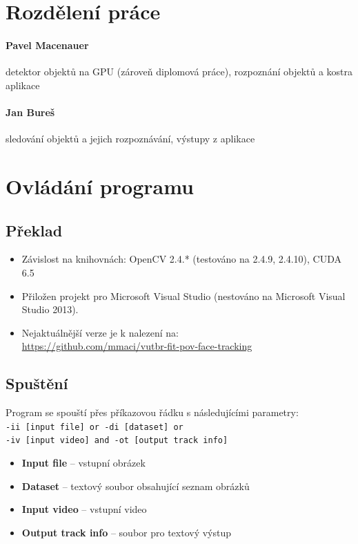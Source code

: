\documentclass[12pt,a4paper,titlepage,final]{report}
\begin{document}
\section{Rozdělení práce}
\paragraph{Pavel Macenauer} detektor objektů na GPU (zároveň diplomová práce), rozpoznání objektů a kostra aplikace

\paragraph{Jan Bureš} sledování objektů a jejich rozpoznávání, výstupy z aplikace

\section{Ovládání programu}

\subsection{Překlad}

\begin{itemize}
\item Závislost na knihovnách: OpenCV 2.4.* (testováno na 2.4.9, 2.4.10), CUDA 6.5 \\
\item Přiložen projekt pro Microsoft Visual Studio (nestováno na Microsoft Visual Studio 2013).
\item Nejaktuálnější verze je k nalezení na:\\  \url{https://github.com/mmaci/vutbr-fit-pov-face-tracking}
\end{itemize}

\subsection{Spuštění}

Program se spouští přes příkazovou řádku s následujícími parametry: \\
\verb|-ii [input file] or -di [dataset] or| \\ \verb|-iv [input video] and -ot [output track info]|

\begin{itemize}
\item \textbf{Input file} – vstupní obrázek
\item \textbf{Dataset} – textový soubor obsahující seznam obrázků
\item \textbf{Input video} – vstupní video
\item \textbf{Output track info} – soubor pro textový výstup
\end{itemize}
\end{document}
